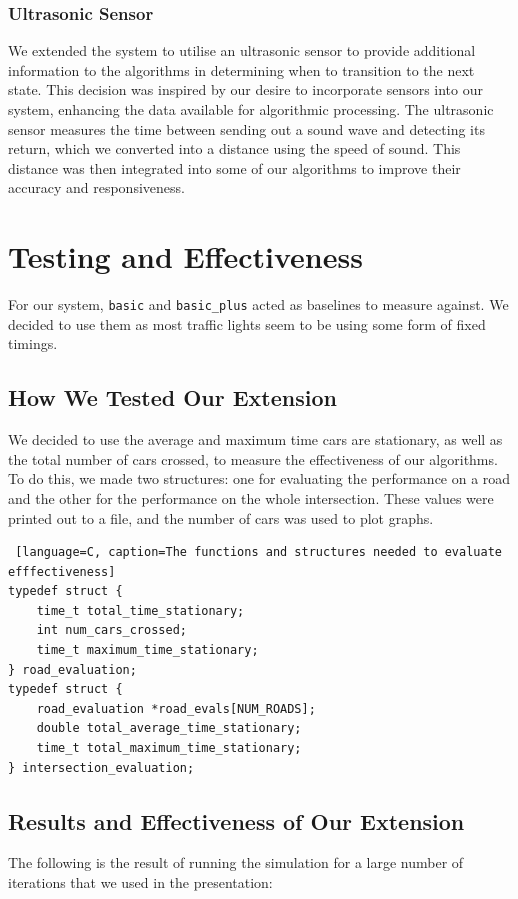 \documentclass{article}
\begin{document}
\subsubsection{Ultrasonic Sensor}
We extended the system to utilise an ultrasonic sensor to provide additional information to the algorithms in determining when to transition to the next state. This decision was inspired by our desire to incorporate sensors into our system, enhancing the data available for algorithmic processing. The ultrasonic sensor measures the time between sending out a sound wave and detecting its return, which we converted into a distance using the speed of sound. This distance was then integrated into some of our algorithms to improve their accuracy and responsiveness.
\section{Testing and Effectiveness}
For our system, \verb|basic| and \verb|basic_plus| acted as baselines to measure against. We decided to use them as most traffic lights seem to be using some form of fixed timings.
\subsection{How We Tested Our Extension}
We decided to use the average and maximum time cars are stationary, as well as the total number of cars crossed, to measure the effectiveness of our algorithms. To do this, we made two structures: one for evaluating the performance on a road and the other for the performance on the whole intersection. These values were printed out to a file, and the number of cars was used to plot graphs.
\begin{lstlisting} [language=C, caption=The functions and structures needed to evaluate efffectiveness]
typedef struct {
    time_t total_time_stationary;
    int num_cars_crossed;
    time_t maximum_time_stationary;
} road_evaluation;
typedef struct {
    road_evaluation *road_evals[NUM_ROADS];
    double total_average_time_stationary;
    time_t total_maximum_time_stationary;
} intersection_evaluation;
\end{lstlisting}
\subsection{Results and Effectiveness of Our Extension}

The following is the result of running the simulation for a large number of iterations that we used in the presentation:
\end{document}

